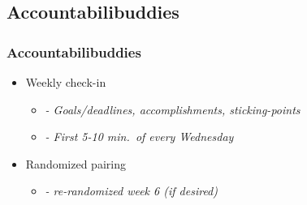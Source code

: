 \documentclass{beamer}
\begin{document}
\subsection{Accountabilibuddies}

\begin{frame}
  \frametitle{Accountabilibuddies}

  \begin{itemize}
    \item Weekly check-in
    \begin{itemize}
      \item[] \emph{- Goals/deadlines, accomplishments, sticking-points}
      \item[] \emph{- First 5-10 min.~of every Wednesday}
    \end{itemize}
    \item Randomized pairing
    \begin{itemize}
      \item[] \emph{- re-randomized week 6 (if desired)}
    \end{itemize}
  \end{itemize}

\end{frame}







\end{document}
